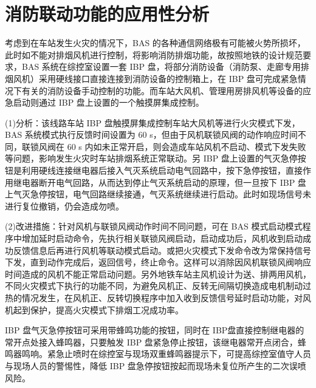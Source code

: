 \section{消防联动功能的应用性分析}
考虑到在车站发生火灾的情况下，BAS 的各种通信网络极有可能被火势所损坏，此时如不能对排烟风机进行控制，将影响消防排烟功能，故按照地铁的设计规范要求，BAS 系统在综控室设置一套 IBP 盘，将部分消防设备（消防泵、走廊专用排烟风机）采用硬线接口直接连接到消防设备的控制箱上，在 IBP 盘可完成紧急情况下有关的消防设备手动控制的功能。而车站大风机、管理用房排风机等设备的应急启动则通过 IBP 盘上设置的一个触摸屏集成控制。\par 
(1)分析：该线路车站 IBP 盘触摸屏集成控制车站大风机等进行火灾模式下发，BAS 系统模式执行反馈时间设置为 60 s，但由于风机联锁风阀的动作响应时间不同，联锁风阀在 60 s 内如未正常开启，则会造成车站风机不启动、模式下发失败等问题，影响发生火灾时车站排烟系统正常联动。另 IBP 盘上设置的气灭急停按钮是利用硬线连接继电器后接入气灭系统启动电气回路中，按下急停按钮，直接作用继电器断开电气回路，从而达到停止气灭系统启动的原理，但一旦按下 IBP 盘上气灭急停按钮，电气回路继续接通，气灭系统继续进行启动。此时如现场信号未进行复位撤销，仍会造成勿喷。\par 
(2)改进措施：针对风机与联锁风阀动作时间不同问题，可在 BAS 模式启动模式程序中增加延时启动命令，先执行相关联锁风阀启动，启动成功后，风机收到启动成功反馈信息后再进行风机等联动模式启动。或把火灾模式下发命令改为常保持信号下发，直到动作完成后，返回信号，终止命令。这样可以消除因风机联锁风阀响应时间造成的风机不能正常启动问题。另外地铁车站主风机设计为送、排两用风机，不同火灾模式下执行的功能不同，为避免风机正、反转无间隔切换造成电机制动过热的情况发生，在风机正、反转切换程序中加入收到反馈信号延时启动功能，对风机起到保护，提高火灾模式下排烟工况成功率。\par 
IBP 盘气灭急停按钮可采用带蜂鸣功能的按钮，同时在 IBP盘直接控制继电器的常开点处接入蜂鸣器，只要触发 IBP 盘紧急停止按钮，该继电器常开点闭合，蜂鸣器鸣响。紧急止喷时在综控室与现场双重蜂鸣器提示下，可提高综控室值守人员与现场人员的警惕性，降低 IBP 盘急停按钮按起而现场未复位所产生的二次误喷风险。
